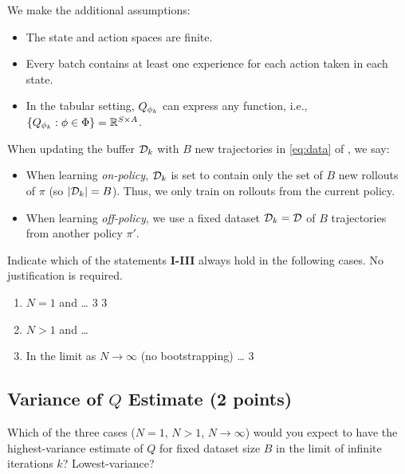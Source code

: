 We make the additional assumptions: 
\begin{itemize}
	\item The state and action spaces are finite.
	\item Every batch contains at least one experience for each action taken in each state.
	\item In the tabular setting, $Q_{\phi_k}$ can express any function, i.e., $\{Q_{\phi_k}:\phi\in\Phi\}=\mathbb{R}^{S\times A}$.
\end{itemize}
When updating the buffer $\mathcal{D}_k$ with $B$ new trajectories in \cref{eq:data} of , we say:
\begin{itemize}
    \item When learning \textit{on-policy}, $\mathcal{D}_k$ is set to contain only the set of $B$ new rollouts of $\pi$ (so $\lvert \mathcal{D}_k \rvert = B$). Thus, we only train on rollouts from the current policy.
	\item When learning \textit{off-policy}, we use a fixed dataset $\mathcal{D}_k=\mathcal{D}$ of $B$ trajectories from another policy $\pi'$. 
\end{itemize}

Indicate which of the statements \textbf{I-III} always hold in the following cases. No justification is required.
\ifsolutions\solve\thesubsection\else
\begin{enumerate}
\item $N=1$ and \ldots \makecols\ncol\heading\choices
	{3} %
	{3} %
\item $N>1$ and \ldots \choices
	{} %
	{} %
\item In the limit as $N\to\infty$ (no bootstrapping) \ldots \choices
	{3} %
	{} %
\end{enumerate}
\fi

\subsection{Variance of $Q$ Estimate (2 points)}
\label{q:variance_estimate}
Which of the three cases ($N = 1$, $N > 1$, $N \to \infty$) would you expect to have the highest-variance estimate of $Q$ for fixed dataset size $B$ in the limit of infinite iterations $k$? Lowest-variance?

